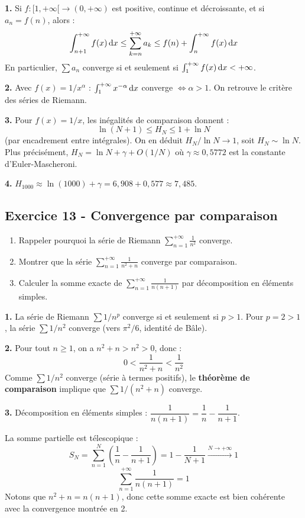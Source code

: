 \documentclass[12pt,a4paper]{article}
\begin{document}
\begin{boitecorrige}
\textbf{1.} Si $f : [1,+\infty[ \to (0,+\infty)$ est positive, continue et décroissante, et si $a_n = f(n)$, alors :
\[
\int_{n+1}^{+\infty} f(x)\,\mathrm{d} x \leq \sum_{k=n}^{+\infty} a_k \leq f(n) + \int_n^{+\infty} f(x)\,\mathrm{d} x
\]
En particulier, $\sum a_n$ converge si et seulement si $\int_1^{+\infty} f(x)\,\mathrm{d} x < +\infty$.

\textbf{2.} Avec $f(x) = 1/x^\alpha$ : $\int_1^{+\infty} x^{-\alpha}\,\mathrm{d} x$ converge $\Leftrightarrow \alpha > 1$. On retrouve le critère des séries de Riemann.

\textbf{3.} Pour $f(x) = 1/x$, les inégalités de comparaison donnent :
\[
\ln(N+1) \leq H_N \leq 1 + \ln N
\]
(par encadrement entre intégrales). On en déduit $H_N / \ln N \to 1$, soit $H_N \sim \ln N$. Plus précisément, $H_N = \ln N + \gamma + O(1/N)$ où $\gamma \approx 0{,}5772$ est la constante d'Euler-Mascheroni.

\textbf{4.} $H_{1000} \approx \ln(1000) + \gamma = 6{,}908 + 0{,}577 \approx 7{,}485$.
\end{boitecorrige}


\subsection*{Exercice 13 - Convergence par comparaison \niveau{\facile}}

\begin{boiteexercice}
\begin{enumerate}
  \item Rappeler pourquoi la série de Riemann $\displaystyle\sum_{n=1}^{+\infty}\frac{1}{n^2}$ converge.
  \item Montrer que la série $\displaystyle\sum_{n=1}^{+\infty}\frac{1}{n^2+n}$ converge par comparaison.
  \item Calculer la somme exacte de $\sum_{n=1}^{+\infty}\frac{1}{n(n+1)}$
  par décomposition en éléments simples.
\end{enumerate}
\end{boiteexercice}

\begin{boitecorrige}
\textbf{1.} La série de Riemann $\sum 1/n^p$ converge si et seulement si $p > 1$. Pour $p = 2 > 1$, la série $\sum 1/n^2$ converge (vers $\pi^2/6$, identité de Bâle).

\textbf{2.} Pour tout $n \geq 1$, on a $n^2+n > n^2 > 0$, donc :
\[
0 < \frac{1}{n^2+n} < \frac{1}{n^2}
\]
Comme $\sum 1/n^2$ converge (série à termes positifs), le \textbf{théorème de comparaison} implique que $\sum 1/(n^2+n)$ converge.

\textbf{3.} Décomposition en éléments simples : $\dfrac{1}{n(n+1)} = \dfrac{1}{n} - \dfrac{1}{n+1}$.

La somme partielle est télescopique :
\[
S_N = \sum_{n=1}^{N}\left(\frac{1}{n}-\frac{1}{n+1}\right) = 1 - \frac{1}{N+1} \xrightarrow{N\to+\infty} 1
\]
\[
\boxed{\sum_{n=1}^{+\infty}\frac{1}{n(n+1)} = 1}
\]
Notons que $n^2+n = n(n+1)$, donc cette somme exacte est bien cohérente avec la convergence montrée en 2.
\end{boitecorrige}
\end{document}

